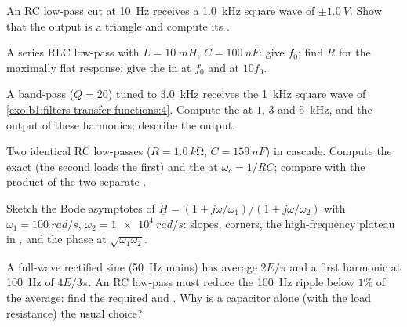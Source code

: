 \begin{exercise}[$\star\star$]\label{exo:b1:filters-transfer-functions:6}
An RC low-pass cut at \qty{10}{Hz} receives a \qty{1.0}{kHz} square
wave of  $\pm\qty{1.0}{V}$. Show that the output is a triangle
and compute its .
\end{exercise}

\begin{exercise}[$\star\star$]\label{exo:b1:filters-transfer-functions:7}
A series RLC low-pass with $L = \qty{10}{mH}$, $C = \qty{100}{nF}$: give
$f_0$; find $R$ for the maximally flat response; give the  in
 at $f_0$ and at $10f_0$.
\end{exercise}

\begin{exercise}[$\star\star$]\label{exo:b1:filters-transfer-functions:8}
A band-pass ($Q = 20$) tuned to \qty{3.0}{kHz} receives the \qty{1}{kHz}
square wave of \cref{exo:b1:filters-transfer-functions:4}. Compute the
 at $1$, $3$ and \qty{5}{kHz}, and the output  of these
harmonics; describe the output.
\end{exercise}

\begin{exercise}[$\star\star$]\label{exo:b1:filters-transfer-functions:9}
Two identical RC low-passes ($R = \qty{1.0}{k\ohm}$, $C = \qty{159}{nF}$)
in cascade. Compute the exact  (the second loads the
first) and the  at $\omega_c = 1/RC$; compare with the product of
the two separate .
\end{exercise}

\begin{exercise}[$\star\star\star$]\label{exo:b1:filters-transfer-functions:10}
Sketch the Bode asymptotes of $\underline H = (1 + j\omega/\omega_1)/
(1 + j\omega/\omega_2)$ with $\omega_1 = \qty{100}{rad/s}$, $\omega_2 =
\qty{1e4}{rad/s}$: slopes, corners, the high-frequency plateau in
, and the phase at $\sqrt{\omega_1\omega_2}$.
\end{exercise}

\begin{exercise}[$\star\star\star$]\label{exo:b1:filters-transfer-functions:11}
A full-wave rectified sine (\qty{50}{Hz} mains) has average $2E/\pi$ and
a first harmonic at \qty{100}{Hz} of  $4E/3\pi$. An RC
low-pass must reduce the \qty{100}{Hz} ripple below $1\%$ of the
average: find the required  and . Why is
a capacitor alone (with the load resistance) the usual choice?
\end{exercise}

